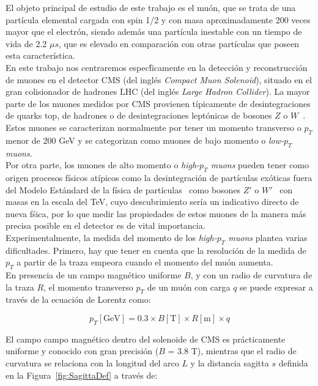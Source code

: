 
El objeto principal de estudio de este trabajo es el mu\'on, que se trata de una part\'icula elemental cargada con spin 1/2 y con masa aproximadamente 200 veces mayor que el electr\'on, siendo adem\'as una part\'icula inestable con un tiempo de vida de 2.2 $\mu s$, que es elevado en comparaci\'on con otras part\'iculas que poseen esta caracter\'istica. \\

En este trabajo nos centraremos espec\'ficamente en la detecci\'on y reconstrucci\'on de muones en el detector CMS (del ingl\'es \textit{Compact Muon Solenoid}), situado en el gran colisionador de hadrones LHC (del ingl\'es \textit{Large Hadron Collider}). La mayor parte de los muones medidos por CMS provienen t\'ipicamente de desintegraciones de quarks top, de hadrones o de desintegraciones lept\'onicas de bosones $Z$ o $W$~\cite{PhysRevD.98.030001}. Estos muones se caracterizan normalmente por tener un momento transverso o $p_{T}$ menor de 200 GeV y se categorizan como muones de bajo momento o \textit{low-$p_{T}$ muons}. \\
Por otra parte, los muones de alto momento o \textit{high-$p_{T}$ muons} pueden tener como origen procesos f\'isicos at\'ipicos como la desintegraci\'on de part\'iculas ex\'oticas fuera del Modelo Est\'andard de la f\'isica de part\'iculas~\cite{gaillard1999standard} como bosones $Z'$ o $W'$~\cite{CMS-PAS-EXO-19-019,2017278} con masas en la escala del TeV, cuyo descubrimiento ser\'ia un indicativo directo de nueva f\'sica, por lo que medir las propiedades de estos muones de la manera m\'as precisa posible en el detector es de vital importancia. \\

Experimentalmente, la medida del momento de los \textit{high-$p_{T}$ muons} plantea varias dificultades. Primero, hay que tener en cuenta que la resoluci\'on de la medida de $p_{T}$ a partir de la traza empeora cuando el momento del mu\'on aumenta. \\
En presencia de un campo magn\'etico uniforme $B$, y con un radio de curvatura de la traza $R$, el momento transverso $p_{T}$ de un mu\'on con carga $q$ se puede expresar a trav\'es de la ecuaci\'on de Lorentz como:

\begin{equation}
  p_{T}[\text{GeV}] = 0.3 \times B[\text{T}] \times R[\text{m}] \times q
\label{eq:pTvsRadius}
\end{equation}

El campo campo magn\'etico dentro del solenoide de CMS es pr\'acticamente uniforme y conocido con gran precisi\'on ($B$ = 3.8 T), mientras que el radio de curvatura se relaciona con la longitud del arco $L$ y la distancia sagitta $s$ definida en la Figura~\ref{fig:SagittaDef} a trav\'es de:

